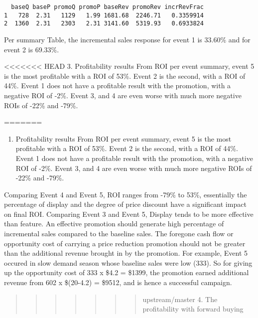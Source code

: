 \documentclass[]{article}
\providecommand{\tightlist}{%
  \setlength{\itemsep}{0pt}\setlength{\parskip}{0pt}}
\begin{document}
\begin{verbatim}
  baseQ baseP promoQ promoP baseRev promoRev incrRevFrac
1   728  2.31   1129   1.99 1681.68  2246.71   0.3359914
2  1360  2.31   2303   2.31 3141.60  5319.93   0.6933824
\end{verbatim}

Per summary Table, the incremental sales response for event 1 is 33.60\%
and for event 2 is 69.33\%.

\textless{}\textless{}\textless{}\textless{}\textless{}\textless{}\textless{}
HEAD 3. Profitability results From ROI per event summary, event 5 is the
most profitable with a ROI of 53\%. Event 2 is the second, with a ROI of
44\%. Event 1 does not have a profitable result with the promotion, with
a negative ROI of -2\%. Event 3, and 4 are even worse with much more
negative ROIs of -22\% and -79\%.

=======

\begin{enumerate}
\def\labelenumi{\arabic{enumi}.}
\setcounter{enumi}{2}
\tightlist
\item
  Profitability results From ROI per event summary, event 5 is the most
  profitable with a ROI of 53\%. Event 2 is the second, with a ROI of
  44\%. Event 1 does not have a profitable result with the promotion,
  with a negative ROI of -2\%. Event 3, and 4 are even worse with much
  more negative ROIs of -22\% and -79\%.
\end{enumerate}

Comparing Event 4 and Event 5, ROI ranges from -79\% to 53\%,
essentially the percentage of display and the degree of price discount
have a significant impact on final ROI. Comparing Event 3 and Event 5,
Display tends to be more effective than feature. An effective promotion
should generate high percentage of incremental sales compared to the
baseline sales. The foregone cash flow or opportunity cost of carrying a
price reduction promotion should not be greater than the additional
revenue brought in by the promotion. For example, Event 5 occured in
slow demand season whose baseline sales were low (333). So for giving up
the opportunity cost of 333 x \$4.2 = \$1399, the promotion earned
additional revenue from 602 x \$(20-4.2) = \$9512, and is hence a
successful campaign.

\begin{quote}
\begin{quote}
\begin{quote}
\begin{quote}
\begin{quote}
\begin{quote}
\begin{quote}
upstream/master 4. The profitability with forward buying
\end{quote}
\end{quote}
\end{quote}
\end{quote}
\end{quote}
\end{quote}
\end{quote}
\end{document}
